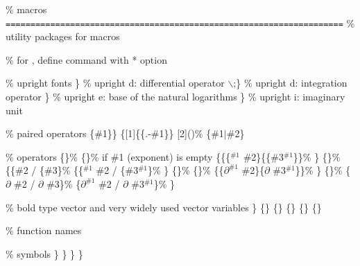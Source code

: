 \documentclass[11pt]{article}
\begin{document}
\% macros \texttt{====================================================================}
\% utility packages for macros
\usepackage{xifthen}
\usepackage{suffix} \% for \WithSuffix, define command with * option

\% upright fonts
\newcommand*{\ud}\{\} \% upright d: differential operator
\newcommand*{\dd}\{$\backslash$;\} \% upright d: integration operator
\newcommand*{\ue}\{\} \% upright e: base of the natural logarithms
\newcommand*{\ui}\{\} \% upright i: imaginary unit

\% paired operators
\newcommand*{\zerodel}{.\kern-\nulldelimiterspace}
\DeclarePairedDelimiter{\verts}{\lvert}{\rvert}
  \newcommand*{\vertsr}[1]\{\{\#1\rvert\}\}
  \WithSuffix{\newcommand*}\vertsr*[1]\{\{\left\zerodel\#1\right\rvert\}\}
\DeclarePairedDelimiter{\parens}{(}{)}
\DeclarePairedDelimiter{\braces}{\lbrace}{\rbrace}
\DeclarePairedDelimiter{\brackets}{[}{]}
\DeclarePairedDelimiter{\angles}{\langle}{\rangle}
\DeclarePairedDelimiterX{\conditional}[2]{(}{)}\%
  \{\#1\mathrel{}\mathclose{}\delimsize\(\vert{}\)\mathopen{}\mathrel{}\#2\}

\newcommand*{\abs}{\verts}
\newcommand*{\vecnorm}{\verts}

\% operators
\newcommand*{\diff}[3][]\{\ifthenelse\{\}\%
  \{\frac{\ud #2}{\ud #3}\}\% if \#1 (exponent) is empty
  \{\frac\{\ud\(^{\text{\#1}}\) \#2\}\{\ud \#3\(^{\text{\#1}}\)\}\}\%
\}
\newcommand*{\idiff}[3][]\{\ifthenelse\{\}\%
  \{\ud \#2 / \ud \#3\}\%
  \{\ud\(^{\text{\#1}}\) \#2 / \ud \#3\(^{\text{\#1}}\)\}\%
\}
\newcommand*{\pdiff}[3][]\{\ifthenelse\{\}\%
  \{\}\%
  \{\frac\{\(\partial^{\text{\#1}}\) \#2\}\{\(\partial\) \#3\(^{\text{\#1}}\)\}\}\%
\}
\newcommand*{\ipdiff}[3][]\{\ifthenelse\{\}\%
  \{\(\partial\) \#2 / \(\partial\) \#3\}\%
  \{\(\partial^{\text{\#1}}\) \#2 / \(\partial\) \#3\(^{\text{\#1}}\)\}\%
\}

\% bold type vector and very widely used vector variables
\newcommand*{\vect}[1]\{\}
\newcommand*{\vzero}\{\vect{0}\}
\newcommand*{\vi}\{\vect{i}\}
\newcommand*{\vj}\{\vect{j}\}
\newcommand*{\vk}\{\vect{k}\}
\newcommand*{\vn}\{\vect{n}\}

\% function names
\DeclareMathOperator{\sech}{sech}
\DeclareMathOperator{\proj}{proj}

\% symbols
\newcommand*{\bbN}\{\}
\newcommand*{\bbZ}\{\}
\newcommand*{\bbR}\{\}
\newcommand*{\bbC}\{\}
\end{document}
